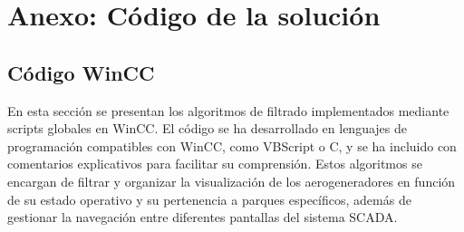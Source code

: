 \chapter{Anexo: Código de la solución}
\label{cap:anexo_codigo_solucion}



\section{Código WinCC}
En esta sección se presentan los algoritmos de filtrado implementados mediante scripts globales en WinCC. El código se ha desarrollado en lenguajes de programación compatibles con WinCC, como VBScript o C, y se ha incluido con comentarios explicativos para facilitar su comprensión. Estos algoritmos se encargan de filtrar y organizar la visualización de los aerogeneradores en función de su estado operativo y su pertenencia a parques específicos, además de gestionar la navegación entre diferentes pantallas del sistema SCADA.

